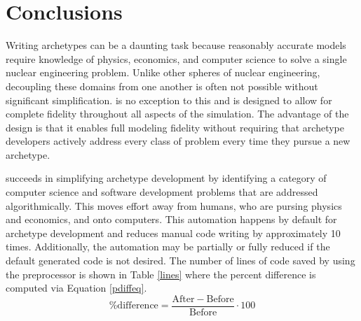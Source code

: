 \section{Conclusions}
\label{sec-conc}

Writing archetypes can be a daunting task because reasonably accurate models
require knowledge of physics, economics, and computer science to solve a single nuclear engineering
problem.  Unlike other spheres of nuclear engineering, decoupling these domains from
one another is often not possible without significant simplification. \cyclus is
no exception to this and is designed to allow for complete fidelity throughout
all aspects of the simulation. The advantage of the \cyclus design is that it
enables full modeling fidelity without requiring that archetype developers actively
address every class of problem every time they pursue a new archetype.

\Cyclus succeeds in simplifying archetype development by identifying a category
of computer science and software development problems that are addressed
algorithmically. This moves effort away from humans, who are pursing physics and
economics, and onto computers. This automation happens by default for
archetype development and reduces manual code writing by approximately
10 times.
Additionally, the automation may be partially or fully reduced
if the default generated code is not desired.
The number of lines of code saved by using the preprocessor is shown in Table
\ref{lines} where the percent difference is computed via Equation \ref{pdiffeq}.
\begin{equation}
\label{pdiffeq}
\mathrm{\% difference} = \frac{\mathrm{After} - \mathrm{Before}}{\mathrm{Before}}\cdot 100
\end{equation}

